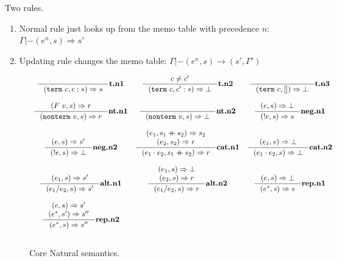\documentclass{article}
\begin{document}
Two rules. 

\begin{enumerate}
\item Normal rule just looks up from the memo table with precedence $n$: $\Gamma |- (e^{n}, s) \Rightarrow s'$
\item Updating rule changes the memo table:  $\Gamma |- (e^{n}, s) \to (s', \Gamma')$

\end{enumerate}

\begin{figure}
    \centering
    \[
    \begin{array}{c c c}
        \inference{}{\parseto{\texttt{term} ~ c}{c : s}{s}}{\textbf{t.n1}} & 
        \inference{c \neq c'}{\parseto{\texttt{term} ~ c}{c' : s}{\bot}}{\textbf{t.n2}} &
        \inference{}{\parseto{\texttt{term} ~ c}{[]}{\bot}}{\textbf{t.n3}} 
        \\ \\
        \inference{\parseto{F ~ v}{s}{r}}{\parseto{\texttt{nonterm} ~ v}{s}{r}}{\textbf{nt.n1}} &
        \inference{}{\parseto{\texttt{nonterm} ~ v}{s}{\bot}}{\textbf{nt.n2}} &
        \inference{
            \parseto{e}{s}{\bot} 
        }{\parseto{!e}{s}{s}}{\textbf{neg.n1}} 
        \\ \\
        \inference{
            \parseto{e}{s}{s'} 
        }{\parseto{!e}{s}{\bot}}{\textbf{neg.n2}} &
        \inference{
            \parseto{e_1}{s_1 \listcat s_2}{s_2} \\
            \parseto{e_2}{s_2}{r}
        }{\parseto{e_1 \cdot e_2}{s_1 \listcat s_2}{r}}{\textbf{cat.n1}} &
        \inference{
            \parseto{e_1}{s}{\bot} 
        }{\parseto{e_1 \cdot e_2}{s}{\bot}}{\textbf{cat.n2}} 
        \\ \\
        \inference{
            \parseto{e_1}{s}{s'} 
        }{\parseto{e_1 / e_2}{s}{s'}}{\textbf{alt.n1}} &
        \inference{
            \parseto{e_1}{s}{\bot} \\
            \parseto{e_2}{s}{r} 
        }{\parseto{e_1 / e_2}{s}{r}}{\textbf{alt.n2}} &
        \inference{
            \parseto{e}{s}{\bot} 
        }{\parseto{e^{*}}{s}{s}}{\textbf{rep.n1}} 
        \\ \\
        \inference{
            \parseto{e}{s}{s'} \\
            \parseto{e^{*}}{s'}{s''}
        }{\parseto{e^{*}}{s}{s''}}{\textbf{rep.n2}}
        & & \\ \\
    \end{array}
    \]
    \caption{Core Natural semantics.}
    \label{fig:nat-semantics}
\end{figure}
\end{document}
